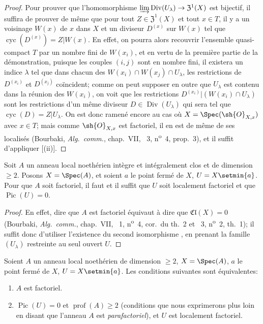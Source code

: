 \begin{proof}
Pour prouver que l'homomorphisme $\varinjlim\operatorname{Div}(U_\lambda)\to\mathfrak{Z}^1(X)$ est bijectif, il suffira de prouver de même que pour tout $Z\in\mathfrak{Z}^1(X)$ et tout $x\in T$, il y a un voisinage $W(x)$
de $x$ dans $X$ et un diviseur $D^{(x)}$ sur $W(x)$ tel que $\operatorname{cyc}(D^{(x)})=Z|W(x)$.
En effet, on pourra alors recouvrir l'ensemble quasi-compact $T$ par un nombre fini de $W(x_i)$, et en vertu de la première partie de la démonstration, puisque les couples $(i,j)$ sont en nombre fini, il existera un indice $\lambda$ tel que dans chacun des $W(x_i)\cap W(x_j)\cap U_\lambda$, les restrictions de $D^{(x_i)}$ et $D^{(x_j)}$ coïncident;
comme on peut supposer en outre que $U_\lambda$ est contenu dans la réunion des $W(x_i)$, on voit que les restrictions $D^{(x_i)}|(W(x_i)\cap U_\lambda)$ sont les restrictions d'un même diviseur $D\in\operatorname{Div}(U_\lambda)$ qui sera tel que $\operatorname{cyc}(D)=Z|U_\lambda$.
On est donc ramené encore au cas où $X=\Spec(\sh{O}_{X,x})$ avec $x\in T$; mais comme $\sh{O}_{X,x}$ est factoriel, il en est de même de ses localisés (Bourbaki, \emph{Alg.\ comm.}, chap.~VII, \textsection~3, n\textsuperscript{o}~4, prop.~3), et il suffit d'appliquer [(ii)].
\end{proof}

\begin{corollary}[21.6.13]
\label{IV.21.6.13}
Soit $A$ un anneau local noethérien intègre et intégralement clos et de dimension $\geq2$.
Posons $X=\Spec(A)$, et soient $a$ le point fermé de $X$, $U=X\setmin\{a\}$.
Pour que $A$ soit factoriel, il faut et il suffit que $U$ soit localement factoriel et que $\operatorname{Pic}(U)=0$.
\end{corollary}

\begin{proof}
En effet, dire que $A$ est factoriel équivaut à dire que $\mathfrak{Cl}(X)=0$ (Bourbaki, \emph{Alg.\ comm.}, chap.~VII, \textsection~1, n\textsuperscript{o}~4, cor.\ du th.~2 et \textsection~3, n\textsuperscript{o}~2, th.~1);
il suffit donc d'utiliser l'existence du second isomorphisme , en prenant la famille $(U_\lambda)$ restreinte au seul ouvert $U$.
\end{proof}

\begin{corollary}[21.6.14]
\label{IV.21.6.14}
Soient $A$ un anneau local noethérien de dimension $\geq2$, $X=\Spec(A)$, $a$ le point fermé de $X$, $U=X\setmin\{a\}$.
Les conditions suivantes sont équivalentes:
\begin{enumerate}[label=\emph{\alph*)}]
  \item $A$ est factoriel.
  \item $\operatorname{Pic}(U)=0$ et $\operatorname{prof}(A)\geq2$ \textup{(conditions que nous exprimerons plus loin  en disant que l'anneau $A$ est \emph{parafactoriel})}, et $U$ est localement factoriel.
\end{enumerate}
\end{corollary}

